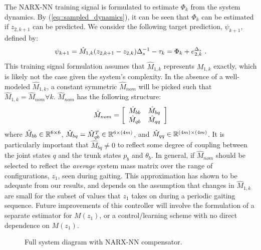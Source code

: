 The  NARX-NN training signal is formulated to estimate $\Phi_{k}$ from the system dynamics. By (\ref{eq::sampled_dynamics}), it can be seen that $\Phi_{k}$ can be estimated if ${z}_{2,k+1}$ can be predicted. We consider the following target prediction, $\psi_{k+1}$,  defined by:
	\vspace{-2mm}
	\begin{equation}
		\vspace{-1.5mm}
		\psi_{k+1} =  \hat{M}_{1,k}({z}_{2,k+1} - {z}_{2,k})\Delta_{s}^{-1} - \tau_{k} = \Phi_{k} + {e}_{2,k}^{\Delta_{s}} \text{ .}
		\label{eq::training_signal}
	\end{equation}
This training signal formulation assumes that $\hat{M}_{1,k}$ represents $M_{1,k}$ exactly, which is likely not the case given the system's complexity. In the absence of a well-modeled $\hat{M}_{1,k}$, a constant symmetric $\hat{M}_{nom}$  will be picked such that $\hat{M}_{1,k} = \hat{M}_{nom} \forall k$. $\hat{M}_{nom}$ has the following structure:
	\begin{equation}
		\vspace{-1.5mm}
		\hat{M}_{nom} = \left[
			\begin{array}{cc}
			\hat{M}_{bb}	&	 \hat{M}_{bq}\\
			\hat{M}_{qb}	&	 \hat{M}_{qq}
			\end{array}
		\right]
	\end{equation}
where 	$\hat{M}_{bb}\in \mathbb{R}^{6\times6}$, 
		$\hat{M}_{bq}=\hat{M}_{qb}^{T} \in \mathbb{R}^{6\times(4m)}$, and  
		$\hat{M}_{qq}\in \mathbb{R}^{(4m)\times(4m)}$. 
It is particularly important that $\hat{M}_{bq}\neq0$ to reflect some degree of coupling between the joint states $q$ and the trunk states $p_{b}$ and $\theta_{b}$. In general, if $\hat{M}_{nom}$ should be selected to reflect the \emph{average} system mass matrix over the range of configurations, $z_{1}$, seen during gaiting. This approximation has shown to be adequate from our results, and depends on the assumption that changes in $\hat{M}_{1,k}$ are small for the subset of values that $z_{1}$ takes on during a periodic gaiting sequence. Future improvements of this controller will involve the formulation of a separate estimator for $M(z_{1})$, or a control/learning scheme with no direct dependence on $M(z_{1})$.
	\begin{figure}[t!]
		\centering
		\caption{Full system diagram with NARX-NN compensator.}
		\label{fig::sys_diagram}
		\vspace{-6.75mm}
	\end{figure}

